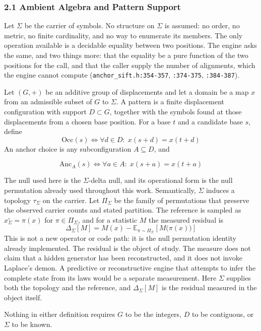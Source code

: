 \subsubsection{2.1 Ambient Algebra and Pattern Support}

Let \(\Sigma\) be the carrier of symbols. No structure on \(\Sigma\) is assumed: no order, no metric, no finite cardinality, and no way to enumerate its members. The only operation available is a decidable equality between two positions. The engine asks the same, and two things more: that the equality be a pure function of the two positions for the call, and that the caller supply the number of alignments, which the engine cannot compute (\texttt{anchor\_sift.h:354-357}, \texttt{:374-375}, \texttt{:384-387}).

Let \((G,+)\) be an additive group of displacements and let a domain be a map \(x\) from an admissible subset of \(G\) to \(\Sigma\). A pattern is a finite displacement configuration with support \(D \subset G\), together with the symbols found at those displacements from a chosen base position. For a base \(t\) and a candidate base \(s\), define
\[
  \mathrm{Occ}(s) \iff \forall d \in D:\; x(s+d) = x(t+d)
\]
An anchor choice is any subconfiguration \(A \subseteq D\), and

\[
  \mathrm{Anc}_A(s) \iff \forall a \in A:\; x(s+a) = x(t+a)
\]

The null used here is the \(\Sigma\)-delta null, and its operational form is the null permutation already used throughout this work. Semantically, \(\Sigma\) induces a topology \(\tau_\Sigma\) on the carrier. Let \(\Pi_\Sigma\) be the family of permutations that preserve the observed carrier counts and stated partition. The reference is sampled as \(x^\circ_\Sigma = \pi(x)\) for \(\pi \in \Pi_\Sigma\), and for a statistic \(M\) the measured residual is
\[
  \Delta_\Sigma[M] = M(x) - \mathbb{E}_{\pi \sim \Pi_\Sigma}\!\left[M\bigl(\pi(x)\bigr)\right]
\]
This is not a new operator or code path: it is the null permutation identity already implemented. The residual is the object of study. The measure does not claim that a hidden generator has been reconstructed, and it does not invoke Laplace's demon. A predictive or reconstructive engine that attempts to infer the complete state from its laws would be a separate measurement. Here \(\Sigma\) supplies both the topology and the reference, and \(\Delta_\Sigma[M]\) is the residual measured in the object itself.

Nothing in either definition requires \(G\) to be the integers, \(D\) to be contiguous, or \(\Sigma\) to be known.

